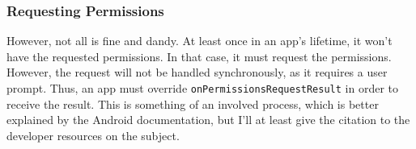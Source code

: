 \subsubsection{Requesting Permissions}
However, not all is fine and dandy. At least once in an app's lifetime, it won't have the requested permissions. In that case, it must request the permissions. However, the 
request will not be handled synchronously, as it requires a user prompt. Thus, an app must override \verb|onPermissionsRequestResult| in order to receive the result.
This is something of an involved process, which is better explained by the Android documentation, but I'll at least give the citation to the
developer resources on the subject.\cite{androidPermissions}

